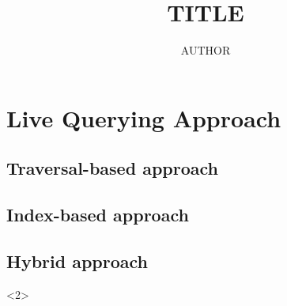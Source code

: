 \documentclass{beamer}
\title{TITLE}
\author{AUTHOR}
\newcommand{\mypause}[1][+]{\onslide<#1>}
\begin{document}
\section{Live Querying Approach}
\subsection{Traversal-based approach}
\subsection{Index-based approach}
\subsection{Hybrid approach}

\begin{frame}<2>
    \let\pause\mypause
    \tableofcontents[pausesubsections]
\end{frame}
\end{document}
